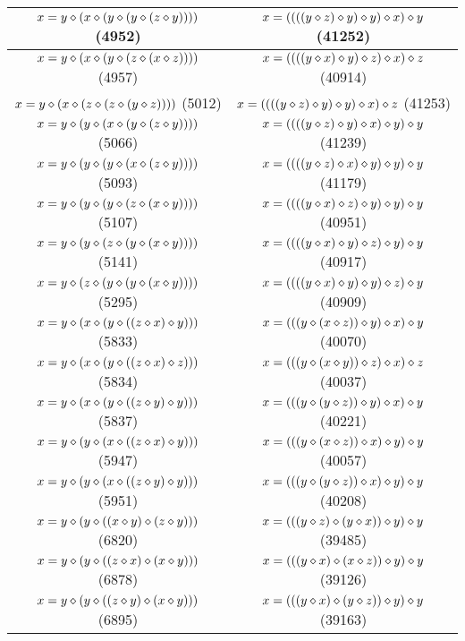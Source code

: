 \begin{table}[h]
\begin{tabular}{|c|c|}
\hline
$x = y \diamond (x \diamond (y \diamond (y \diamond (z \diamond y))))$ (4952) & $x = ((((y \diamond z) \diamond y) \diamond y) \diamond x) \diamond y$ (41252) \\ \hline
$x = y \diamond (x \diamond (y \diamond (z \diamond (x \diamond z))))$ (4957) & $x = ((((y \diamond x) \diamond y) \diamond z) \diamond x) \diamond z$ (40914) \\ \hline
$x = y \diamond (x \diamond (z \diamond (z \diamond (y \diamond z))))$ (5012) & $x = ((((y \diamond z) \diamond y) \diamond y) \diamond x) \diamond z$ (41253) \\ \hline
$x = y \diamond (y \diamond (x \diamond (y \diamond (z \diamond y))))$ (5066) & $x = ((((y \diamond z) \diamond y) \diamond x) \diamond y) \diamond y$ (41239) \\ \hline
$x = y \diamond (y \diamond (y \diamond (x \diamond (z \diamond y))))$ (5093) & $x = ((((y \diamond z) \diamond x) \diamond y) \diamond y) \diamond y$ (41179) \\ \hline
$x = y \diamond (y \diamond (y \diamond (z \diamond (x \diamond y))))$ (5107) & $x = ((((y \diamond x) \diamond z) \diamond y) \diamond y) \diamond y$ (40951) \\ \hline
$x = y \diamond (y \diamond (z \diamond (y \diamond (x \diamond y))))$ (5141) & $x = ((((y \diamond x) \diamond y) \diamond z) \diamond y) \diamond y$ (40917) \\ \hline
$x = y \diamond (z \diamond (y \diamond (y \diamond (x \diamond y))))$ (5295) & $x = ((((y \diamond x) \diamond y) \diamond y) \diamond z) \diamond y$ (40909) \\ \hline
$x = y \diamond (x \diamond (y \diamond ((z \diamond x) \diamond y)))$ (5833) & $x = (((y \diamond (x \diamond z)) \diamond y) \diamond x) \diamond y$ (40070) \\ \hline
$x = y \diamond (x \diamond (y \diamond ((z \diamond x) \diamond z)))$ (5834) & $x = (((y \diamond (x \diamond y)) \diamond z) \diamond x) \diamond z$ (40037) \\ \hline
$x = y \diamond (x \diamond (y \diamond ((z \diamond y) \diamond y)))$ (5837) & $x = (((y \diamond (y \diamond z)) \diamond y) \diamond x) \diamond y$ (40221) \\ \hline
$x = y \diamond (y \diamond (x \diamond ((z \diamond x) \diamond y)))$ (5947) & $x = (((y \diamond (x \diamond z)) \diamond x) \diamond y) \diamond y$ (40057) \\ \hline
$x = y \diamond (y \diamond (x \diamond ((z \diamond y) \diamond y)))$ (5951) & $x = (((y \diamond (y \diamond z)) \diamond x) \diamond y) \diamond y$ (40208) \\ \hline
$x = y \diamond (y \diamond ((x \diamond y) \diamond (z \diamond y)))$ (6820) & $x = (((y \diamond z) \diamond (y \diamond x)) \diamond y) \diamond y$ (39485) \\ \hline
$x = y \diamond (y \diamond ((z \diamond x) \diamond (x \diamond y)))$ (6878) & $x = (((y \diamond x) \diamond (x \diamond z)) \diamond y) \diamond y$ (39126) \\ \hline
$x = y \diamond (y \diamond ((z \diamond y) \diamond (x \diamond y)))$ (6895) & $x = (((y \diamond x) \diamond (y \diamond z)) \diamond y) \diamond y$ (39163) \\ \hline

\end{tabular}
\end{table}
